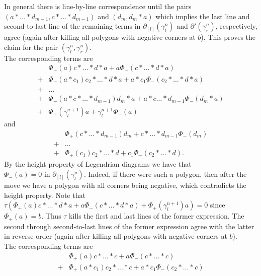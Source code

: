 \documentclass[11pt]{amsart}
\makeatletter
\renewenvironment{proof}[1][\proofname] {\par\pushQED{\qed}{\normalfont\bfseries\topsep6\p@\@plus6\p@\relax #1\@addpunct{.} }}{\popQED\endtrivlist\@endpefalse}
\theoremstyle{mystyle}
\newcommand{\<}{\langle}
\renewcommand{\>}{\rangle}
\makeatother
\begin{document}
\begin{proof}
    In general there is line-by-line correspondence until the pairs $(a * \dots  * d_{m-1}, c * \dots  * d_{m-1})$ and $(d_m, d_m*a)$ which implies the last line and second-to-last line of the remaining terms in $\partial_{[l]}(\gamma_l^n)$ and $\partial'(\gamma_r^n)$, respectively, agree (again after killing all polygons with negative corners at $b$). This proves the claim for the pair $(\gamma_l^n, \gamma_r^n)$. \\
     The corresponding terms are \begin{align*}
        &\Phi_+(a) c * \dots  * d * a + a \Phi_-(c * \dots  * d * a) \\
        +& \Phi_+(a * c_1) c_2 * \dots  * d * a + a * c_1 \Phi_-(c_2 * \dots  * d * a) \\
        +& \ldots \\
        +& \Phi_+(a * c * \dots  * d_{m-1}) d_m * a + a * c \dots  * d_{m-1} \Phi_-(d_m * a) \\
        +& \Phi_+(\gamma_l^{n+1}) a + \gamma_l^{n+1} \Phi_-(a)
    \end{align*} and \begin{align*}
        & \Phi_+(c * \dots  * d_{m-1}) d_m + c * \dots  * d_{m-1} \Phi_-(d_m) \\
        +& \ldots \\
        +& \Phi_+(c_1)c_2 * \dots  * d + c_1 \Phi_-(c_2 * \dots  * d).
    \end{align*} By the height property of Legendrian diagrams we have that $\Phi_-(a) = 0 \text{ in } \partial_{[l]}(\gamma_l^n)$. Indeed, if there were such a polygon, then after the move we have a polygon with all corners being negative, which contradicts the height property. Note that $\tau(\Phi_+(a) c * \dots  * d * a + a \Phi_-(c * \dots  * d * a) + \Phi_+(\gamma_l^{n+1}) a) = 0$ since $\Phi_+(a) = b$. Thus $\tau$ kills the first and last lines of the former expression. The second through second-to-last lines of the former expression agree with the latter in reverse order (again after killing all polygons with negative corners at $b$). \\
 The corresponding terms are \begin{align*}
        &\Phi_+(a) c * \dots  * c + a \Phi_-(c * \dots  * c) \\
        +& \Phi_+(a * c_1) c_2 * \dots  * c + a * c_1 \Phi_-(c_2 * \dots  * c) \\

\end{align*}
\end{proof}
\end{document}

